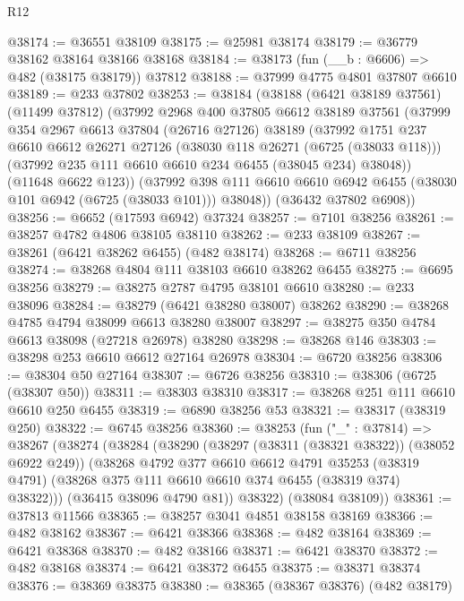 \begin{lexlean}{R12}
\begin{coremodule}
@38174 := @36551 @38109
@38175 := @25981 @38174
@38179 := @36779 @38162 @38164 @38166 @38168
@38184 := @38173 (fun (__b : @6606) => @482 (@38175 @38179)) @37812
@38188 := @37999 @4775 @4801 @37807 @6610
@38189 := @233 @37802
@38253 := @38184
    (@38188
      (@6421 @38189 @37561)
      (@11499 @37812)
      (@37992
        @2968
        @400
        @37805
        @6612
        @38189
        @37561
        (@37999
          @354
          @2967
          @6613
          @37804
          (@26716 @27126)
          @38189
          (@37992
            @1751
            @237
            @6610
            @6612
            @26271
            @27126
            (@38030 @118 @26271 (@6725 (@38033 @118)))
            (@37992 @235 @111 @6610 @6610 @234 @6455 (@38045 @234) @38048))
          (@11648 @6622 @123))
        (@37992 @398 @111 @6610 @6610 @6942 @6455 (@38030 @101 @6942 (@6725 (@38033 @101))) @38048))
      (@36432 @37802 @6908))
@38256 := @6652 (@17593 @6942) @37324
@38257 := @7101 @38256
@38261 := @38257 @4782 @4806 @38105 @38110
@38262 := @233 @38109
@38267 := @38261 (@6421 @38262 @6455) (@482 @38174)
@38268 := @6711 @38256
@38274 := @38268 @4804 @111 @38103 @6610 @38262 @6455
@38275 := @6695 @38256
@38279 := @38275 @2787 @4795 @38101 @6610
@38280 := @233 @38096
@38284 := @38279 (@6421 @38280 @38007) @38262
@38290 := @38268 @4785 @4794 @38099 @6613 @38280 @38007
@38297 := @38275 @350 @4784 @6613 @38098 (@27218 @26978) @38280
@38298 := @38268 @146
@38303 := @38298 @253 @6610 @6612 @27164 @26978
@38304 := @6720 @38256
@38306 := @38304 @50 @27164
@38307 := @6726 @38256
@38310 := @38306 (@6725 (@38307 @50))
@38311 := @38303 @38310
@38317 := @38268 @251 @111 @6610 @6610 @250 @6455
@38319 := @6890 @38256 @53
@38321 := @38317 (@38319 @250)
@38322 := @6745 @38256
@38360 := @38253
    (fun ("_" : @37814) =>
    @38267
      (@38274
        (@38284
          (@38290
            (@38297 (@38311 (@38321 @38322)) (@38052 @6922 @249))
            (@38268
              @4792
              @377
              @6610
              @6612
              @4791
              @35253
              (@38319 @4791)
              (@38268 @375 @111 @6610 @6610 @374 @6455 (@38319 @374) @38322)))
          (@36415 @38096 @4790 @81))
        @38322)
      (@38084 @38109))
@38361 := @37813 @11566
@38365 := @38257 @3041 @4851 @38158 @38169
@38366 := @482 @38162
@38367 := @6421 @38366
@38368 := @482 @38164
@38369 := @6421 @38368
@38370 := @482 @38166
@38371 := @6421 @38370
@38372 := @482 @38168
@38374 := @6421 @38372 @6455
@38375 := @38371 @38374
@38376 := @38369 @38375
@38380 := @38365 (@38367 @38376) (@482 @38179)

\end{coremodule}
\end{lexlean}
